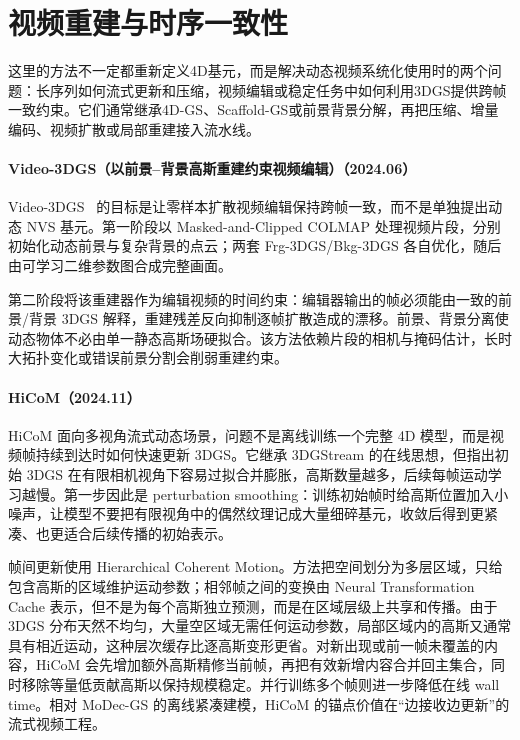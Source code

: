 \section{视频重建与时序一致性}

这里的方法不一定都重新定义4D基元，而是解决动态视频系统化使用时的两个问题：长序列如何流式更新和压缩，视频编辑或稳定任务中如何利用3DGS提供跨帧一致约束。它们通常继承4D-GS、Scaffold-GS或前景背景分解，再把压缩、增量编码、视频扩散或局部重建接入流水线。
\paragraph{Video-3DGS（以前景--背景高斯重建约束视频编辑）（2024.06）}
Video-3DGS~\cite{2406_02541} 的目标是让零样本扩散视频编辑保持跨帧一致，而不是单独提出动态 NVS 基元。第一阶段以 Masked-and-Clipped COLMAP 处理视频片段，分别初始化动态前景与复杂背景的点云；两套 Frg-3DGS/Bkg-3DGS 各自优化，随后由可学习二维参数图合成完整画面。

第二阶段将该重建器作为编辑视频的时间约束：编辑器输出的帧必须能由一致的前景/背景 3DGS 解释，重建残差反向抑制逐帧扩散造成的漂移。前景、背景分离使动态物体不必由单一静态高斯场硬拟合。该方法依赖片段的相机与掩码估计，长时大拓扑变化或错误前景分割会削弱重建约束。

\paragraph{HiCoM（2024.11）\cite{2411_07541}}
HiCoM 面向多视角流式动态场景，问题不是离线训练一个完整 4D 模型，而是视频帧持续到达时如何快速更新 3DGS。它继承 3DGStream 的在线思想，但指出初始 3DGS 在有限相机视角下容易过拟合并膨胀，高斯数量越多，后续每帧运动学习越慢。第一步因此是 perturbation smoothing：训练初始帧时给高斯位置加入小噪声，让模型不要把有限视角中的偶然纹理记成大量细碎基元，收敛后得到更紧凑、也更适合后续传播的初始表示。

帧间更新使用 Hierarchical Coherent Motion。方法把空间划分为多层区域，只给包含高斯的区域维护运动参数；相邻帧之间的变换由 Neural Transformation Cache 表示，但不是为每个高斯独立预测，而是在区域层级上共享和传播。由于 3DGS 分布天然不均匀，大量空区域无需任何运动参数，局部区域内的高斯又通常具有相近运动，这种层次缓存比逐高斯变形更省。对新出现或前一帧未覆盖的内容，HiCoM 会先增加额外高斯精修当前帧，再把有效新增内容合并回主集合，同时移除等量低贡献高斯以保持规模稳定。并行训练多个帧则进一步降低在线 wall time。相对 MoDec-GS 的离线紧凑建模，HiCoM 的锚点价值在“边接收边更新”的流式视频工程。

